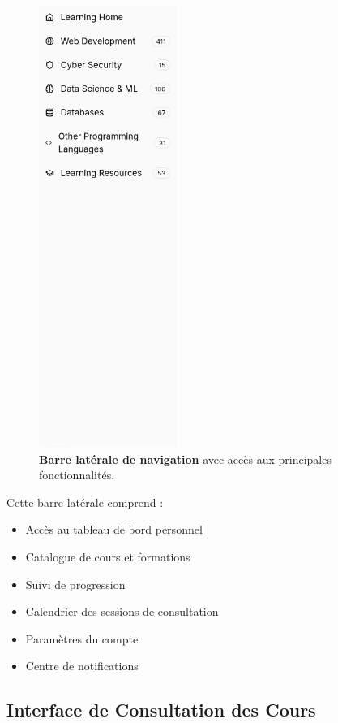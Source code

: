 \begin{figure}[h!]
  \centering
  \includegraphics[width=0.4\textwidth,keepaspectratio]{week_3_img/sidebare.png}
  \caption{\textbf{Barre latérale de navigation} avec accès aux principales fonctionnalités.}
  \label{fig:sidebar_nav}
\end{figure}

Cette barre latérale comprend :
\begin{itemize}
  \item Accès au tableau de bord personnel
  \item Catalogue de cours et formations
  \item Suivi de progression
  \item Calendrier des sessions de consultation
  \item Paramètres du compte
  \item Centre de notifications
\end{itemize}

\subsection{Interface de Consultation des Cours}

